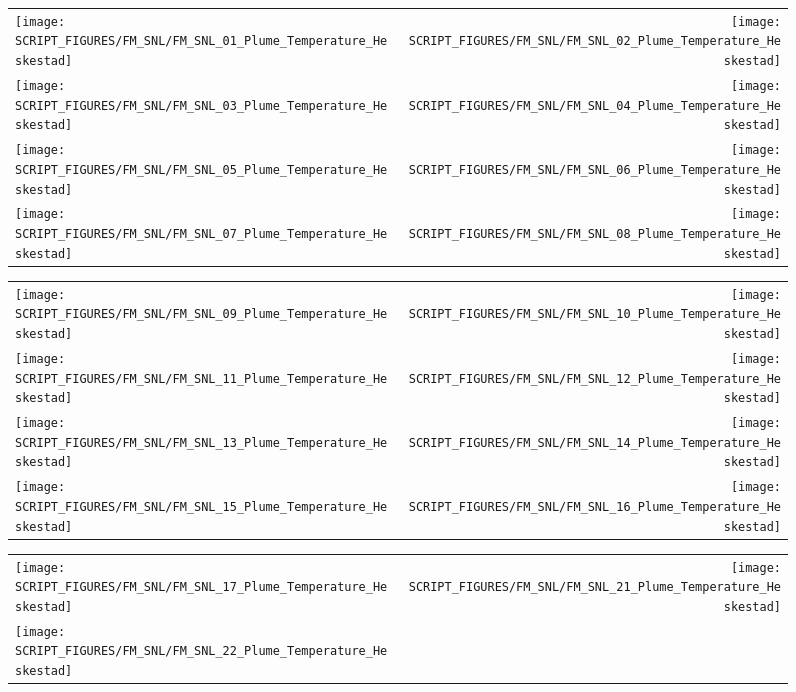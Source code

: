 \begin{figure}[!ht]
\begin{tabular*}{\textwidth}{l@{\extracolsep{\fill}}r}
\texttt{[image: SCRIPT\_FIGURES/FM\_SNL/FM\_SNL\_01\_Plume\_Temperature\_Heskestad]} &
\texttt{[image: SCRIPT\_FIGURES/FM\_SNL/FM\_SNL\_02\_Plume\_Temperature\_Heskestad]} \\
\texttt{[image: SCRIPT\_FIGURES/FM\_SNL/FM\_SNL\_03\_Plume\_Temperature\_Heskestad]} &
\texttt{[image: SCRIPT\_FIGURES/FM\_SNL/FM\_SNL\_04\_Plume\_Temperature\_Heskestad]} \\
\texttt{[image: SCRIPT\_FIGURES/FM\_SNL/FM\_SNL\_05\_Plume\_Temperature\_Heskestad]} &
\texttt{[image: SCRIPT\_FIGURES/FM\_SNL/FM\_SNL\_06\_Plume\_Temperature\_Heskestad]} \\
\texttt{[image: SCRIPT\_FIGURES/FM\_SNL/FM\_SNL\_07\_Plume\_Temperature\_Heskestad]} &
\texttt{[image: SCRIPT\_FIGURES/FM\_SNL/FM\_SNL\_08\_Plume\_Temperature\_Heskestad]}
\end{tabular*}
\end{figure}

\begin{figure}[!ht]
\begin{tabular*}{\textwidth}{l@{\extracolsep{\fill}}r}
\texttt{[image: SCRIPT\_FIGURES/FM\_SNL/FM\_SNL\_09\_Plume\_Temperature\_Heskestad]} &
\texttt{[image: SCRIPT\_FIGURES/FM\_SNL/FM\_SNL\_10\_Plume\_Temperature\_Heskestad]} \\
\texttt{[image: SCRIPT\_FIGURES/FM\_SNL/FM\_SNL\_11\_Plume\_Temperature\_Heskestad]} &
\texttt{[image: SCRIPT\_FIGURES/FM\_SNL/FM\_SNL\_12\_Plume\_Temperature\_Heskestad]} \\
\texttt{[image: SCRIPT\_FIGURES/FM\_SNL/FM\_SNL\_13\_Plume\_Temperature\_Heskestad]} &
\texttt{[image: SCRIPT\_FIGURES/FM\_SNL/FM\_SNL\_14\_Plume\_Temperature\_Heskestad]} \\
\texttt{[image: SCRIPT\_FIGURES/FM\_SNL/FM\_SNL\_15\_Plume\_Temperature\_Heskestad]} &
\texttt{[image: SCRIPT\_FIGURES/FM\_SNL/FM\_SNL\_16\_Plume\_Temperature\_Heskestad]}
\end{tabular*}
\end{figure}

\begin{figure}[!ht]
\begin{tabular*}{\textwidth}{l@{\extracolsep{\fill}}r}
\texttt{[image: SCRIPT\_FIGURES/FM\_SNL/FM\_SNL\_17\_Plume\_Temperature\_Heskestad]} &
\texttt{[image: SCRIPT\_FIGURES/FM\_SNL/FM\_SNL\_21\_Plume\_Temperature\_Heskestad]} \\
\texttt{[image: SCRIPT\_FIGURES/FM\_SNL/FM\_SNL\_22\_Plume\_Temperature\_Heskestad]}
\end{tabular*}
\end{figure}

